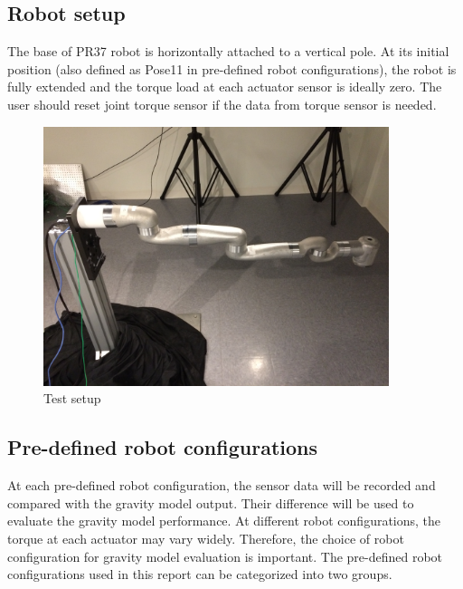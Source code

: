 
\subsection{Robot setup}

The base of PR37 robot is horizontally attached to a vertical pole. At its initial position (also defined as Pose11 in pre-defined robot configurations), the robot is fully extended and the torque load at each actuator sensor is ideally zero. The user should reset joint torque sensor if the data from torque sensor is needed.

\begin{figure}
	\begin{center}
				\includegraphics[width=0.9\textwidth]{./images/Pose11}%
		\caption{Test setup}
		\label{fig:pose11}%
	\end{center}
\end{figure}


\subsection{Pre-defined robot configurations}

At each pre-defined robot configuration, the sensor data will be recorded and compared with the gravity model output. Their difference will be used to evaluate the gravity model performance.  At different robot configurations, the torque at each actuator may vary widely. Therefore, the choice of robot configuration for gravity model evaluation is important. 
The pre-defined robot configurations used in this report can be categorized into two groups. 

